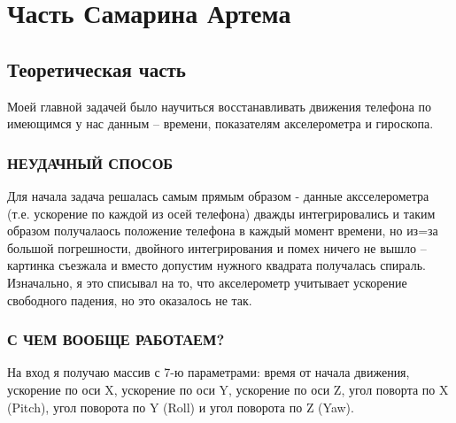 \section{Часть Самарина Артема}

\subsection{Теоретическая часть}
Моей главной задачей было научиться восстанавливать движения телефона по имеющимся у нас данным – времени, показателям акселерометра и гироскопа.

\subsubsection{НЕУДАЧНЫЙ СПОСОБ}

Для начала задача решалась самым прямым образом - данные аксселерометра (т.е. ускорение по каждой из осей телефона) дважды интегрировались и таким образом получалаось положение телефона в каждый момент времени, но из=за большой погрешности, двойного интегрирования и помех ничего не вышло – картинка съезжала и вместо допустим нужного квадрата получалась спираль. Изначально, я это списывал на то, что акселерометр учитывает ускорение свободного падения, но это оказалось не так.

\subsubsection{С ЧЕМ ВООБЩЕ РАБОТАЕМ?}

На вход я получаю массив с 7-ю параметрами: время от начала движения, ускорение по оси X, ускорение по оси Y, ускорение по оси Z, угол поворта по X (Pitch), угол поворота по Y (Roll) и угол поворота по Z (Yaw).

\begin{figure}[H]
\end{figure}


